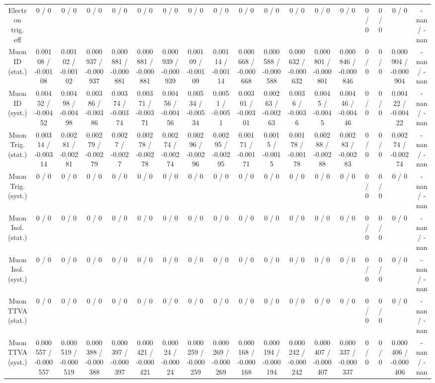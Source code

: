 \documentclass[10pt]{article}
\begin{document}
\begin{table}[htbp]
\begin{center}
\begin{tabular}{|c|c|c|c|c|c|c|c|c|c|c|c|c|c|c|c|c|c|}
  Electron trig. eff & 0 / 0 & 0 / 0 & 0 / 0 & 0 / 0 & 0 / 0 & 0 / 0 & 0 / 0 & 0 / 0 & 0 / 0 & 0 / 0 & 0 / 0 & 0 / 0 & 0 / 0 & 0 / 0 & 0 / 0 & 0 / 0 & -nan / -nan \\ 
  Muon ID (stat.) & 0.00108 / -0.00108 & 0.00102 / -0.00102 & 0.000937 / -0.000937 & 0.000881 / -0.000881 & 0.000881 / -0.000881 & 0.000939 / -0.000939 & 0.00109 / -0.00109 & 0.00114 / -0.00114 & 0.000668 / -0.000668 & 0.000588 / -0.000588 & 0.000632 / -0.000632 & 0.000801 / -0.000801 & 0.000846 / -0.000846 & 0 / 0 & 0 / 0 & 0.000904 / -0.000904 & -nan / -nan \\ 
  Muon ID (syst.) & 0.00452 / -0.00452 & 0.00498 / -0.00498 & 0.00386 / -0.00386 & 0.00374 / -0.00374 & 0.00371 / -0.00371 & 0.00456 / -0.00456 & 0.00534 / -0.00534 & 0.0051 / -0.0051 & 0.00301 / -0.00301 & 0.00263 / -0.00263 & 0.0036 / -0.0036 & 0.0045 / -0.0045 & 0.00446 / -0.00446 & 0 / 0 & 0 / 0 & 0.00422 / -0.00422 & -nan / -nan \\ 
  Muon Trig. (stat.) & 0.00314 / -0.00314 & 0.00281 / -0.00281 & 0.00279 / -0.00279 & 0.0027 / -0.0027 & 0.00278 / -0.00278 & 0.00274 / -0.00274 & 0.00296 / -0.00296 & 0.00295 / -0.00295 & 0.00171 / -0.00171 & 0.0015 / -0.0015 & 0.00178 / -0.00178 & 0.00288 / -0.00288 & 0.00283 / -0.00283 & 0 / 0 & 0 / 0 & 0.00274 / -0.00274 & -nan / -nan \\ 
  Muon Trig. (syst.) & 0 / 0 & 0 / 0 & 0 / 0 & 0 / 0 & 0 / 0 & 0 / 0 & 0 / 0 & 0 / 0 & 0 / 0 & 0 / 0 & 0 / 0 & 0 / 0 & 0 / 0 & 0 / 0 & 0 / 0 & 0 / 0 & -nan / -nan \\ 
  Muon Isol. (stat.) & 0 / 0 & 0 / 0 & 0 / 0 & 0 / 0 & 0 / 0 & 0 / 0 & 0 / 0 & 0 / 0 & 0 / 0 & 0 / 0 & 0 / 0 & 0 / 0 & 0 / 0 & 0 / 0 & 0 / 0 & 0 / 0 & -nan / -nan \\ 
  Muon Isol. (syst.) & 0 / 0 & 0 / 0 & 0 / 0 & 0 / 0 & 0 / 0 & 0 / 0 & 0 / 0 & 0 / 0 & 0 / 0 & 0 / 0 & 0 / 0 & 0 / 0 & 0 / 0 & 0 / 0 & 0 / 0 & 0 / 0 & -nan / -nan \\ 
  Muon TTVA (stat.) & 0 / 0 & 0 / 0 & 0 / 0 & 0 / 0 & 0 / 0 & 0 / 0 & 0 / 0 & 0 / 0 & 0 / 0 & 0 / 0 & 0 / 0 & 0 / 0 & 0 / 0 & 0 / 0 & 0 / 0 & 0 / 0 & -nan / -nan \\ 
  Muon TTVA (syst.) & 0.000557 / -0.000557 & 0.000519 / -0.000519 & 0.000388 / -0.000388 & 0.000397 / -0.000397 & 0.000421 / -0.000421 & 0.00024 / -0.00024 & 0.000259 / -0.000259 & 0.000269 / -0.000269 & 0.000168 / -0.000168 & 0.000194 / -0.000194 & 0.000242 / -0.000242 & 0.000407 / -0.000407 & 0.000337 / -0.000337 & 0 / 0 & 0 / 0 & 0.000406 / -0.000406 & -nan / -nan \\ 

\end{tabular}
\end{center}
\end{table}
\end{document}
